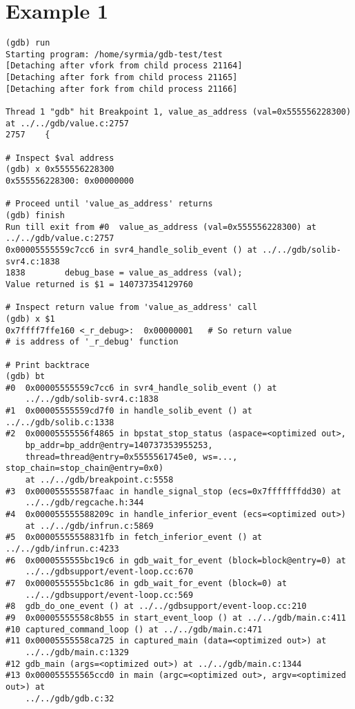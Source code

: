 \documentclass{report}
\begin{document}
\section *{Example 1}
\begin{verbatim}
(gdb) run
Starting program: /home/syrmia/gdb-test/test 
[Detaching after vfork from child process 21164]
[Detaching after fork from child process 21165]
[Detaching after fork from child process 21166]

Thread 1 "gdb" hit Breakpoint 1, value_as_address (val=0x555556228300) 
at ../../gdb/value.c:2757
2757	{

# Inspect $val address 
(gdb) x 0x555556228300
0x555556228300:	0x00000000

# Proceed until 'value_as_address' returns
(gdb) finish
Run till exit from #0  value_as_address (val=0x555556228300) at 
../../gdb/value.c:2757
0x00005555559c7cc6 in svr4_handle_solib_event () at ../../gdb/solib-svr4.c:1838
1838	    debug_base = value_as_address (val);
Value returned is $1 = 140737354129760

# Inspect return value from 'value_as_address' call
(gdb) x $1
0x7ffff7ffe160 <_r_debug>:	0x00000001   # So return value 
# is address of '_r_debug' function

# Print backtrace
(gdb) bt
#0  0x00005555559c7cc6 in svr4_handle_solib_event () at 
    ../../gdb/solib-svr4.c:1838
#1  0x00005555559cd7f0 in handle_solib_event () at ../../gdb/solib.c:1338
#2  0x00005555556f4865 in bpstat_stop_status (aspace=<optimized out>, 
    bp_addr=bp_addr@entry=140737353955253, 
    thread=thread@entry=0x5555561745e0, ws=..., stop_chain=stop_chain@entry=0x0)
    at ../../gdb/breakpoint.c:5558
#3  0x000055555587faac in handle_signal_stop (ecs=0x7fffffffdd30) at 
    ../../gdb/regcache.h:344
#4  0x000055555588209c in handle_inferior_event (ecs=<optimized out>) 
    at ../../gdb/infrun.c:5869
#5  0x00005555558831fb in fetch_inferior_event () at ../../gdb/infrun.c:4233
#6  0x0000555555bc19c6 in gdb_wait_for_event (block=block@entry=0) at 
    ../../gdbsupport/event-loop.cc:670
#7  0x0000555555bc1c86 in gdb_wait_for_event (block=0) at 
    ../../gdbsupport/event-loop.cc:569
#8  gdb_do_one_event () at ../../gdbsupport/event-loop.cc:210
#9  0x00005555558c8b55 in start_event_loop () at ../../gdb/main.c:411
#10 captured_command_loop () at ../../gdb/main.c:471
#11 0x00005555558ca725 in captured_main (data=<optimized out>) at 
    ../../gdb/main.c:1329
#12 gdb_main (args=<optimized out>) at ../../gdb/main.c:1344
#13 0x000055555565ccd0 in main (argc=<optimized out>, argv=<optimized out>) at 
    ../../gdb/gdb.c:32


\end{verbatim}
\end{document}
